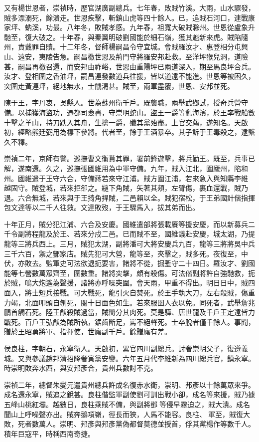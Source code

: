 \begin{pinyinscope}
又有楊世恩者，崇禎時，歷官湖廣副總兵。七年春，敗賊竹溪。大雨，山水驟發，賊多漂溺死，餘潰走。世恩疾擊，斬鎮山虎等四十餘人。已，追賊石河口，連戰康家坪、蚋溪，功最。八年冬，敗賊孝感。九年春，祖寬大破賊滁州。世恩從盧象升馳至，復大破之。十年春，與秦翼明破劉國能於細石嶺，獲其魁新來虎。賊陷隨州，責戴罪自贖。十二年冬，督師楊嗣昌令守宜城。會賊羅汝才、惠登相分屯興山、遠安，夷陵告急。嗣昌檄世恩及荊門守將羅安邦赴救。至洋坪猴兒洞，道險甚，嗣昌再檄召還，而安邦由祚峪，世恩由重陽坪已兩道深入，期至馬良坪合兵。汝才、登相圍之香油坪，嗣昌連發數道兵往援，皆以道遠不能進。世恩等被困久，突圍走黃連坪，絕地無水，士饑渴甚。賊至，兩軍盡覆，世恩、安邦並死。

陳于王，字丹衷，吳縣人。世為蘇州衛千戶。既襲職，兩舉武鄉試，授奇兵營守備。以捕獲海盜功，遷都司僉書，守崇明蛇山。盜王一爵等亂海濱，於王率戰船數十擊之羊山，持刀跌入其舟，生擒一爵，殲其黨殆盡。上官交薦，遂知名。天啟初，經略熊廷弼用為標下參將。代者至，餘于王酒暴卒。其子訴于王毒殺之，逮繫久不釋。

崇禎二年，京師有警。巡撫曹文衡貰其罪，署前鋒遊擊，將兵勤王。既至，兵事已解，遂南還。久之，巡撫張國維用為中軍守備。九年，賊入江北，圍廬州，陷和州。國維遣于王守六合，守備蔣若來守江浦。賊方圍江浦，若來急入與知縣李維越固守。賊登城，若來拒卻之。縋下角賊，矢著其頰，左臂傷，裹血還戰，賊乃退。六合無城，若來與于王掎角捍賊，二邑賴以全。賊犯宿松，于王弟國計偕指揮包文達等以二千人往救。文達敗歿，于王驟馬入，拔其弟而出。

十年正月，賊分犯江浦、六合及安慶。國維遣部將張載賡等援安慶，而以新募兵二千令副將程龍及於王、若來分戍二邑。已而賊不至，國維議赴安慶，城太湖，乃提龍等三將兵西上。三月，賊犯太湖，副將潘可大將安慶兵九百，龍等三將將吳中兵三千六百，禦之酆家店。賊先犯可大營，龍等至，夾擊之，賊多死。夜復至，中伏，亦敗去。監軍史可法欲退扼要害，諸將不從，掘塹守二十四日。羅汝才、劉國能等七營數萬眾齊至，圍數重。諸將突擊，頗有殺傷。可法偕副將許自強馳救，扼於賊，鳴大炮遙為聲援，諸將亦呼噪突圍。會天雨，甲重不得出。明日日中，賊四面入，將士短兵接戰。可大戰死，龍引火自焚死。於王手執大刀，左右殺賊，傷重力竭，北面叩頭自刎死，閱十日面色如生。若來服圉人衣以免。同死者，武舉詹兆鵬首觸石死。陸王猷殺賊過當，賊臠分其肉死。莫是驊、唐世龍及千戶王定遠皆力戰死。百戶王弘猷為賊所執，鋸齒斷足，罵不絕聲死。士卒脫者僅千餘人。事聞，贈於王昭勇將軍、指揮使，世廕副千戶。餘贈廕有差。

侯良柱，字朝石，永寧衛人。天啟初，累官四川副總兵。討奢崇明父子，復遵義城。又與參議趙邦清招降奢寅黨安鑾。六年五月代李維新為四川總兵官，鎮永寧。時崇明敗奔水西，與安邦彥合，貴州兵數討不克。

崇禎二年，總督朱燮元遣貴州總兵許成名復赤水衛，崇明、邦彥以十餘萬眾來爭。成名還永寧，賊追之銳甚。良柱偕監軍副使劉可訓出戰小卻，成名等來援，賊乃據五峰山桃紅壩。越數日，良柱乘賊不備，與副將鄧等侵早霧迫之，賊大潰。成名聞山上呼噪聲亦出。賊奔鵝項嶺，徑長而狹，人馬不能容。良柱、軍至，賊復大敗，死者數萬人。崇明、邦彥與邦彥黨偽都督莫德並授首，俘其黨楊作等數千人。積年巨寇平，時稱西南奇捷。


\end{pinyinscope}
